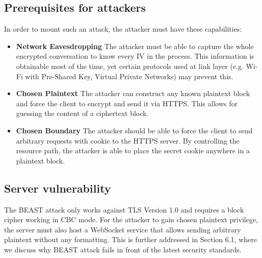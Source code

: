 \documentclass{acm_proc_article-sp}
\begin{document}
\subsection{Prerequisites for attackers}
In order to mount such an attack, the attacker must have these capabilities:
\begin{itemize}
    \item \textbf{Network Eavesdropping} The attacker must be able to capture the whole 
    encrypted conversation to know every IV in the process. This information is obtainable most
    of the time, yet certain protocols used at link layer (e.g. Wi-Fi with Pre-Shared Key, Virtual Private
    Networks) may prevent this.
    \item \textbf{Chosen Plaintext} The attacker can construct any known plaintext block and force the
    client to encrypt and send it via HTTPS. This allows for guessing the content of a ciphertext block.
    \item \textbf{Chosen Boundary} The attacker should be able to force the client to send arbitrary
    requests with cookie to the HTTPS server. By controlling the resource path, the attacker is able to
    place the secret cookie anywhere in a plaintext block.
\end{itemize}
\subsection{Server vulnerability}
The BEAST attack only works against TLS Version 1.0 and requires a block cipher working in CBC
mode. For the attacker to gain chosen plaintext privilege, the server must also host a WebSocket
service that allows sending arbitrary plaintext without any formatting. This is further addressed in
Section 6.1, where we discuss why BEAST attack fails in front of the latest security standards.
\end{document}
